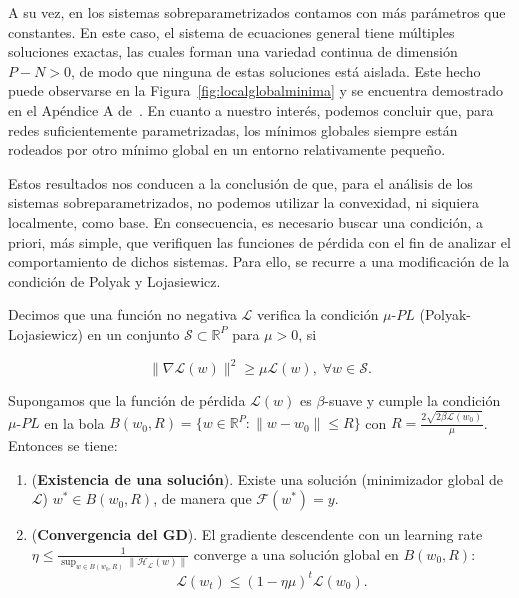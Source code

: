 A su vez, en los sistemas sobreparametrizados contamos con más parámetros que constantes. En este caso, el sistema de ecuaciones general tiene múltiples soluciones exactas, las cuales forman una variedad continua de dimensión $P - N > 0$, de modo que ninguna de estas soluciones está aislada. Este hecho puede observarse en la Figura~\ref{fig:localglobalminima} y se encuentra demostrado en el Apéndice A de~\cite{Liu2021}. En cuanto a nuestro interés, podemos concluir que, para redes suficientemente parametrizadas, los mínimos globales siempre están rodeados por otro mínimo global en un entorno relativamente pequeño.

Estos resultados nos conducen a la conclusión de que, para el análisis de los sistemas sobreparametrizados, no podemos utilizar la convexidad, ni siquiera localmente, como base. En consecuencia, es necesario buscar una condición, a priori, más simple, que verifiquen las funciones de pérdida con el fin de analizar el comportamiento de dichos sistemas. Para ello, se recurre a una modificación de la condición de Polyak y Lojasiewicz.

\begin{definicion}[Condición $\mu$-$PL$]
    Decimos que una función no negativa $\mathcal{L}$ verifica la condición $\mu$-$PL$ (Polyak-Lojasiewicz) en un conjunto $\mathcal{S} \subset \mathbb{R}^{P}$ para $\mu > 0$, si

    \[
        \| \nabla \mathcal{L}(w) \|^{2} \geq \mu \mathcal{L}(w), \; \forall w \in \mathcal{S}.
    \]
\end{definicion}

\begin{teorema}
    Supongamos que la función de pérdida $\mathcal{L}(w)$ es $\beta$-suave y cumple la condición $\mu$-$PL$ en la bola $B(w_0, R) = \{ w \in \mathbb{R}^{P} : \| w - w_0 \| \leq R \}$ con $R = \frac{2 \sqrt{2 \beta \mathcal{L}(w_0)}}{\mu}$. Entonces se tiene:

    \begin{enumerate}
        \item (\textbf{Existencia de una solución}). Existe una solución (minimizador global de $\mathcal{L}$) $w^{*} \in B(w_0, R)$, de manera que $\mathcal{F}(w^{*}) = y$.
        \item (\textbf{Convergencia del GD}). El gradiente descendente con un learning rate $\eta \leq \frac{1}{\sup_{w \in B(w_0, R)} \| \mathcal{H}_{\mathcal{L}}(w) \|}$ converge a una solución global en $B(w_0, R)$:
        \[
            \mathcal{L}(w_{t}) \leq (1 - \eta \mu)^{t} \mathcal{L}(w_0).
        \]
    \end{enumerate}
\end{teorema}


